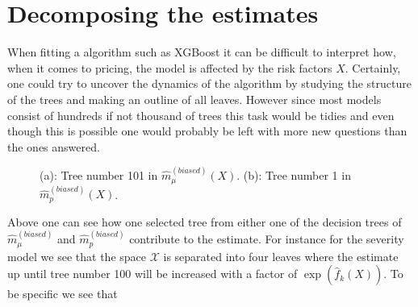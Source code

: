 \documentclass[
]{article}
\begin{document}
\newpage

\hypertarget{decomposing-the-estimates}{%
\section{Decomposing the estimates}\label{decomposing-the-estimates}}

When fitting a algorithm such as XGBoost it can be difficult to
interpret how, when it comes to pricing, the model is affected by the
risk factors \(X\). Certainly, one could try to uncover the dynamics of
the algorithm by studying the structure of the trees and making an
outline of all leaves. However since most models consist of hundreds if
not thousand of trees this task would be tidies and even though this is
possible one would probably be left with more new questions than the
ones answered.

\begin{figure}[h]
    \centering
    \qquad
    \caption{(a): Tree number 101 in $\hat m^{(biased)}_\mu(X)$. (b): Tree number 1 in $\hat m^{(biased)}_p(X)$.}
\end{figure}

Above one can see how one selected tree from either one of the decision
trees of \(\hat m^{(biased)}_\mu\) and \(\hat m^{(biased)}_p\)
contribute to the estimate. For instance for the severity model we see
that the space \(\mathcal X\) is separated into four leaves where the
estimate up until tree number 100 will be increased with a factor of
\(\exp(\hat f_k(X))\). To be specific we see that
\end{document}
